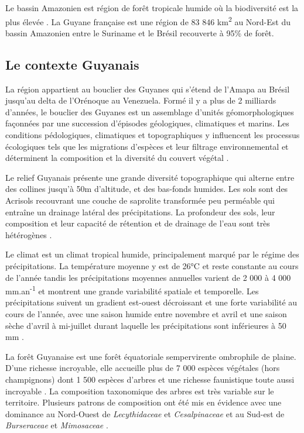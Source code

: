 \documentclass[
  11pt,
  french,
  A4paper,
  extrafontsizes,onecolumn,openright
  ]{memoir}
\begin{document}
Le bassin Amazonien est région de forêt tropicale humide où la
biodiversité est la plus élevée \autocite{Gentry1988}. La Guyane
française est une région de 83 846 km\textsuperscript{2} au Nord-Est du
bassin Amazonien entre le Suriname et le Brésil recouverte à 95\% de
forêt.

\subsection{Le contexte Guyanais}\label{le-contexte-guyanais}

La région appartient au bouclier des Guyanes qui s'étend de l'Amapa au
Brésil jusqu'au delta de l'Orénoque au Venezuela. Formé il y a plus de 2
milliards d'années, le bouclier des Guyanes est un assemblage d'unités
géomorphologiques façonnées par une succession d'épisodes géologiques,
climatiques et marins. Les conditions pédologiques, climatiques et
topographiques y influencent les processus écologiques tels que les
migrations d'espèces et leur filtrage environnemental et déterminent la
composition et la diversité du couvert végétal \autocite{Guitet2015}.

Le relief Guyanais présente une grande diversité topographique qui
alterne entre des collines jusqu'à 50m d'altitude, et des bas-fonds
humides. Les sols sont des Acrisols recouvrant une couche de saprolite
transformée peu perméable qui entraîne un drainage latéral des
précipitations. La profondeur des sols, leur composition et leur
capacité de rétention et de drainage de l'eau sont très hétérogènes
\autocites{Ferry2010}{Robert2003}.

Le climat est un climat tropical humide, principalement marqué par le
régime des précipitations. La température moyenne y est de 26°C et reste
constante au cours de l'année tandis les précipitations moyennes
annuelles varient de 2 000 à 4 000 mm.an\textsuperscript{-1} et montrent
une grande variabilité spatiale et temporelle. Les précipitations
suivent un gradient est-ouest décroissant et une forte variabilité au
cours de l'année, avec une saison humide entre novembre et avril et une
saison sèche d'avril à mi-juillet durant laquelle les précipitations
sont inférieures à 50 mm \autocite{Wagner2011}.

La forêt Guyanaise est une forêt équatoriale sempervirente ombrophile de
plaine. D'une richesse incroyable, elle accueille plus de 7 000 espèces
végétales (hors champignons) dont 1 500 espèces d'arbres et une richesse
faunistique toute aussi incroyable \autocite{DeNoter2008}. La
composition taxonomique des arbres est très variable sur le territoire.
Plusieurs patrons de composition ont été mis en évidence avec une
dominance au Nord-Ouest de \emph{Lecythidaceae} et \emph{Cesalpinaceae}
et au Sud-est de \emph{Burseraceae} et \emph{Mimosaceae}
\autocites{Sabatier1989}{Sabatier199}{Guitet2015}.
\end{document}
